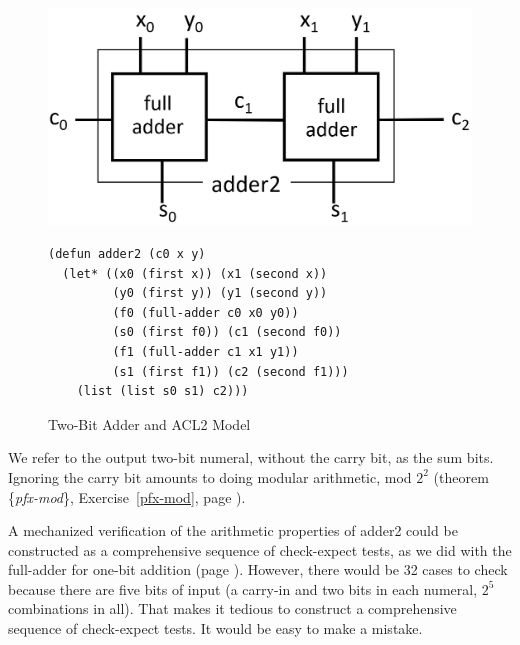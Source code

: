 \begin{figure}
\begin{center}
\includegraphics[scale=0.25]{Images/adder2.png}
\begin{Verbatim}
(defun adder2 (c0 x y)
  (let* ((x0 (first x)) (x1 (second x))
         (y0 (first y)) (y1 (second y))
         (f0 (full-adder c0 x0 y0))
         (s0 (first f0)) (c1 (second f0))
         (f1 (full-adder c1 x1 y1))
         (s1 (first f1)) (c2 (second f1)))
    (list (list s0 s1) c2)))
\end{Verbatim}
\end{center}
\caption{Two-Bit Adder and ACL2 Model}
\label{fig:adder2}
\end{figure}

We refer to the output two-bit numeral, without the carry bit,
as the sum bits.
Ignoring the carry bit amounts to doing modular arithmetic, mod $2^2$
(theorem \{\emph{pfx-mod}\}, Exercise~\ref{pfx-mod}, page \pageref{pfx-mod}).

A mechanized verification of the arithmetic properties of \textsf{adder2}
could be constructed as a comprehensive sequence of check-expect tests,
as we did with the \textsf{full-adder} for one-bit addition
(page \pageref{full-adder-model-check}).
However, there would be 32 cases to check
because there are five bits of input
(a carry-in and two bits in each numeral, $2^5$ combinations in all).
That makes it tedious to construct a comprehensive sequence of check-expect tests.
It would be easy to make a mistake.

